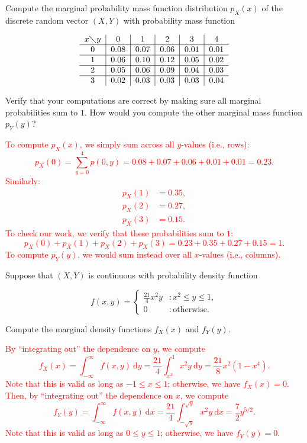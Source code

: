 \documentclass[12pt,reqno]{amsart}
\begin{document}
\bigskip
\prob Compute the marginal probability mass function distribution $p_X(x)$ of the discrete random vector $(X,Y)$ with probability mass function


\[\begin{tabular}{c|c|c|c|c|c}
$x \diagdown y$ & 0 & 1 & 2 & 3 & 4  \\ \hline
0 & 0.08 & 0.07 & 0.06 & 0.01 & 0.01 \\ \hline
1 & 0.06 & 0.10 & 0.12 & 0.05 & 0.02 \\ \hline
2 & 0.05 & 0.06 & 0.09 & 0.04 & 0.03 \\ \hline
3 & 0.02 & 0.03 & 0.03 & 0.03 & 0.04 
\end{tabular}\]

\medskip
Verify that your computations are correct by making sure all marginal probabilities sum to $1$. How would you compute the other marginal mass function $p_Y(y)$?

\bigskip
\textcolor{red}{To compute $p_X(x)$, we simply sum across all $y$-values (i.e., rows):
    \[p_X(0) = \sum_{y=0}^4 p(0,y) = 0.08 + 0.07 + 0.06 + 0.01 + 0.01 = 0.23.\]
Similarly:
    \begin{align*}
        p_X(1) &= 0.35, \\
        p_X(2) &= 0.27, \\
        p_X(3) &= 0.15.
    \end{align*}
To check our work, we verify that these probabilities sum to $1$:
    \[p_X(0)+p_X(1)+p_X(2)+p_X(3) = 0.23+0.35+0.27+0.15 = 1.\]
To compute $p_Y(y)$, we would sum instead over all $x$-values (i.e., columns).}
\bigskip











\bigskip
\prob Suppose that $(X,Y)$ is continuous with probability density function

\[f(x,y) = \begin{cases}
    \frac{21}{4}x^2 y & : x^2 \leq y \leq 1, \\
    0 & : \text{otherwise}.
\end{cases}\]

Compute the marginal density functions $f_X(x)$ and $f_Y(y)$.

\bigskip
\textcolor{red}{By ``integrating out'' the dependence on $y$, we compute
    \[f_X(x) = \int_{-\infty}^\infty f(x,y) \ \text{d}y = \frac{21}{4}\int_{x^2}^1 x^2y \ \text{d}y = \frac{21}{8}x^2(1-x^4). \]
Note that this is valid as long as $-1 \leq x \leq 1$; otherwise, we have $f_X(x)=0$. Then, by ``integrating out'' the dependence on $x$, we compute
    \[f_Y(y) = \int_{-\infty}^\infty f(x,y) \ \text{d} x = \frac{21}{4} \int_{-\sqrt{y}}^{\sqrt{y}}x^2y \ \text{d} x = \frac{7}{2}y^{5/2}.\]
Note that this is valid as long as $0\leq y \leq 1$; otherwise, we have $f_Y(y)=0$.}
\end{document}
